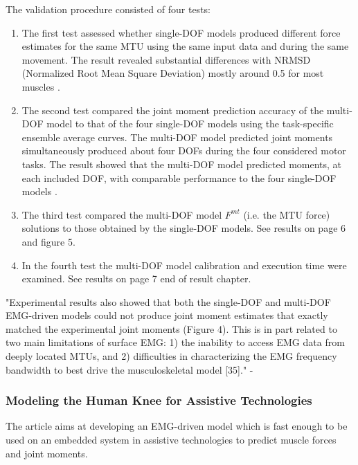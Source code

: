 The validation procedure consisted of four tests:
\begin{enumerate}
    \item The first test assessed whether single-DOF models produced different force estimates for the same MTU using the same input data and during the same movement. The result revealed substantial differences with NRMSD (Normalized Root Mean Square Deviation) mostly around 0.5 for most muscles \cite[Fig. 3]{Sartori2012a}.
    \item The second test compared the joint moment prediction accuracy of the multi-DOF model to that of the four single-DOF models using the task-specific ensemble average curves. The multi-DOF model predicted joint moments simultaneously produced about four DOFs during the four considered motor tasks. The result showed that the multi-DOF model predicted moments, at each included DOF, with comparable performance to the four single-DOF models \cite[Fig. 4]{Sartori2012a}.
    \item The third test compared the multi-DOF model $F^{mt}$ (i.e. the MTU force) solutions to those obtained by the single-DOF models. See results on page 6 and figure 5.
    \item In the fourth test the multi-DOF model calibration and execution time were examined. See results on page 7 end of result chapter.
\end{enumerate}

"Experimental results also showed that both the single-DOF and multi-DOF \ac{EMG}-driven models could not produce joint moment estimates that exactly matched the experimental joint moments (Figure 4). This is in part related to two main limitations of surface \ac{EMG}: 1) the inability to access \ac{EMG} data from deeply located MTUs, and 2) difficulties in characterizing the \ac{EMG} frequency bandwidth to best drive the musculoskeletal model [35]." - \cite[p. 11]{Sartori2012a}

\subsubsection{Modeling the Human Knee for Assistive Technologies}

The article aims at developing an \ac{EMG}-driven model which is fast enough to be used on an embedded system in assistive technologies to predict muscle forces and joint moments.

